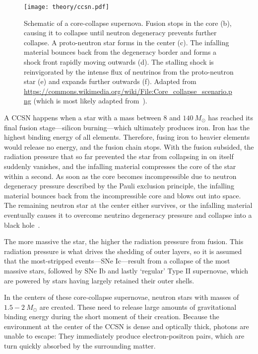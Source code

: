 \begin{figure}[htb]
  \texttt{[image: theory/ccsn.pdf]}
  \caption[Core-collapse supernova]{Schematic of a core-collapse supernova. Fusion stops in the core (b), causing it to collapse until neutron degeneracy prevents further collapse. A proto-neutron star forms in the center (c). The infalling material bounces back from the degeneracy border and forms a shock front rapidly moving outwards (d). The stalling shock is reinvigorated by the intense flux of neutrinos from the proto-neutron star (e) and expands further outwards (f). Adapted from \url{https://commons.wikimedia.org/wiki/File:Core_collapse_scenario.png} (which is most likely adapted from~\cite{Janka2012}).}
\end{figure}

A CCSN happens when a star with a mass between $8$ and $140~M_\odot$ has reached its final fusion stage---silicon burning---which ultimately produces iron. Iron has the highest binding energy of all elements. Therefore, fusing iron to heavier elements would release no energy, and the fusion chain stops. With the fusion subsided, the radiation pressure that so far prevented the star from collapsing in on itself suddenly vanishes, and the infalling material compresses the core of the star within a second. As soon as the core becomes incompressible due to neutron degeneracy pressure described by the Pauli exclusion principle, the infalling material bounces back from the incompressible core and blows out into space. The remaining neutron star at the center either survives, or the infalling material eventually causes it to overcome neutrino degeneracy pressure and collapse into a black hole~\cite{Alsabti2017}.~

The more massive the star, the higher the radiation pressure from fusion. This radiation pressure is what drives the shedding of outer layers, so it is assumed that the most-stripped events---SNe Ic---result from a collapse of the most massive stars, followed by SNe Ib and lastly `regular' Type II supernovae, which are powered by stars having largely retained their outer shells.

In the centers of these core-collapse supernovae, neutron stars with masses of $1.5-2~M_\odot$ are created. These need to release large amounts of gravitational binding energy during the short moment of their creation. Because the environment at the center of the CCSN is dense and optically thick, photons are unable to escape: They immediately produce electron-positron pairs, which are turn quickly absorbed by the surrounding matter.

